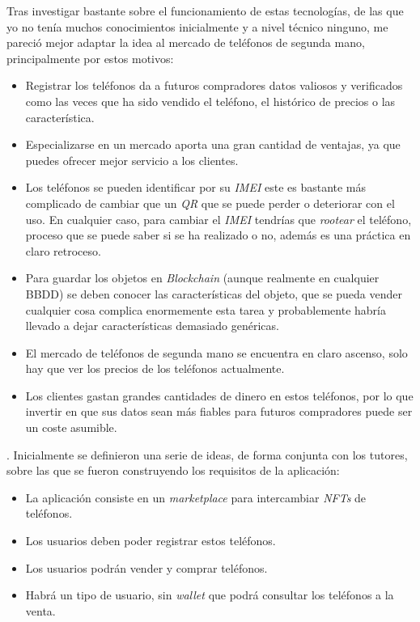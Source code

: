 Tras investigar bastante sobre el funcionamiento de estas tecnologías, de las que yo no tenía muchos conocimientos inicialmente y a nivel técnico ninguno, me pareció mejor adaptar la idea al mercado de teléfonos de segunda mano, principalmente por estos motivos:
\begin{itemize}
    \item Registrar los teléfonos da a futuros compradores datos valiosos y verificados como las veces que ha sido vendido el teléfono, el histórico de precios o las característica.
    \item Especializarse en un mercado aporta una gran cantidad de ventajas, ya que puedes ofrecer mejor servicio a los clientes.
    \item Los teléfonos se pueden identificar por su \textit{IMEI} este es bastante más complicado de cambiar que un \textit{QR} que se puede perder o deteriorar con el uso. En cualquier caso, para cambiar el \textit{IMEI} tendrías que \textit{rootear} el teléfono, proceso que se puede saber si se ha realizado o no, además es una práctica en claro retroceso.
    \item Para guardar los objetos en \textit{Blockchain} (aunque realmente en cualquier BBDD) se deben conocer las características del objeto, que se pueda vender cualquier cosa complica enormemente esta tarea y probablemente habría llevado a dejar características demasiado genéricas.
    \item El mercado de teléfonos de segunda mano se encuentra en claro ascenso, solo hay que ver los precios de los teléfonos actualmente.
    \item Los clientes gastan grandes cantidades de dinero en estos teléfonos, por lo que invertir en que sus datos sean más fiables para futuros compradores puede ser un coste asumible.
\end{itemize}.
Inicialmente se definieron una serie de ideas, de forma conjunta con los tutores, sobre las que se fueron construyendo los requisitos de la aplicación:
\begin{itemize}
    \item La aplicación consiste en un \textit{marketplace} para intercambiar \textit{NFTs} de teléfonos.
    \item Los usuarios deben poder registrar estos teléfonos.
    \item Los usuarios podrán vender y comprar teléfonos.
    \item Habrá un tipo de usuario, sin \textit{wallet} que podrá consultar los teléfonos a la venta.
\end{itemize}


